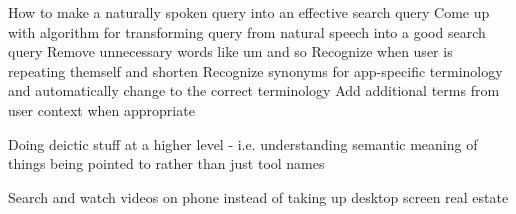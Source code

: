 How to make a naturally spoken query into an effective search query
Come up with algorithm for transforming query from natural speech into a good search query
Remove unnecessary words like um and so
Recognize when user is repeating themself and shorten
Recognize synonyms for app-specific terminology and automatically change to the correct terminology 
Add additional terms from user context when appropriate




Doing deictic stuff at a higher level - i.e. understanding semantic meaning of things being pointed to rather than just tool names

Search and watch videos on phone instead of taking up desktop screen real estate
